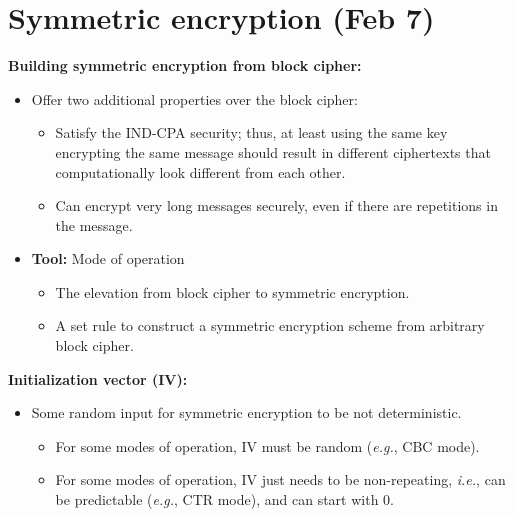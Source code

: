\documentclass{article}
\newcommand{\parhead}[1]{\noindent \textbf{#1}}
\begin{document}
\section{Symmetric encryption (Feb 7)}
\parhead{Building symmetric encryption from block cipher:}
\begin{itemize}
    \item Offer two additional properties over the block cipher:
    \begin{itemize}
        \item Satisfy the IND-CPA security; thus, at least using the same key encrypting the same message should result in different ciphertexts that computationally look different from each other.
        
        \item Can encrypt very long messages securely, even if there are repetitions in the message.
    \end{itemize}
    
    \item {\bf Tool:} Mode of operation
    \begin{itemize}
        \item The elevation from block cipher to symmetric encryption.
        
        \item A set rule to construct a symmetric encryption scheme from arbitrary block cipher.
    \end{itemize}
\end{itemize}

\parhead{Initialization vector (IV):}
\begin{itemize}
    \item Some random input for symmetric encryption to be not deterministic.
    
    \begin{itemize}
        \item For some modes of operation, IV must be random (\emph{e.g.}, CBC mode).
        
        \item For some modes of operation, IV just needs to be non-repeating, \emph{i.e.}, can be predictable (\emph{e.g.}, CTR mode), and can start with $0$. 
    \end{itemize}
\end{itemize}
\end{document}
